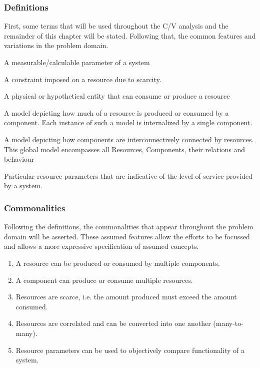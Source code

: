 \subsubsection{Definitions}
First, some terms that will be used throughout the C/V analysis and the remainder of this chapter will be stated. Following that, the common features and variations in the problem domain.
\begin{description}[style=nextline]
\nospace
\item[Resource] A measurable/calculable parameter of a system
\item[Resource constraint] A constraint imposed on a resource due to scarcity.
\item[Component] A physical or hypothetical entity that can consume or produce a resource
\item[Resource Utilization Model (RUM)] A model depicting how much of a resource is produced or consumed by a component. Each instance of such a model is internalized by a single component.
\item[Resource Distribution Model (RDM)] A model depicting how components are interconnectively connected by resources. This global model encompasses all Resources, Components, their relations and behaviour
\item[Quality of Service (QoS)] Particular resource parameters that are indicative of the level of service provided by a system.
\end{description}
\subsubsection{Commonalities}
Following the definitions, the commonalities that appear throughout the problem domain will be asserted. These assumed features allow the efforts to be focussed and allows a more expressive specification of assumed concepts.
\begin{enumerate}[label=C\rdmid .\arabic*]
\nospace
\item \label{c:1resource_multiplex} A resource can be produced or consumed by multiple components.
\item \label{c:2component_multiplex} A component can produce or consume multiple resources.
\item \label{c:3scarce} Resources are scarce, i.e. the amount produced must exceed the amount consumed.
\item \label{c:4res_transf} Resources are correlated and can be converted into one another (many-to-many).
\item \label{c:5optimize} Resource parameters can be used to objectively compare functionality of a system.
\end{enumerate}

